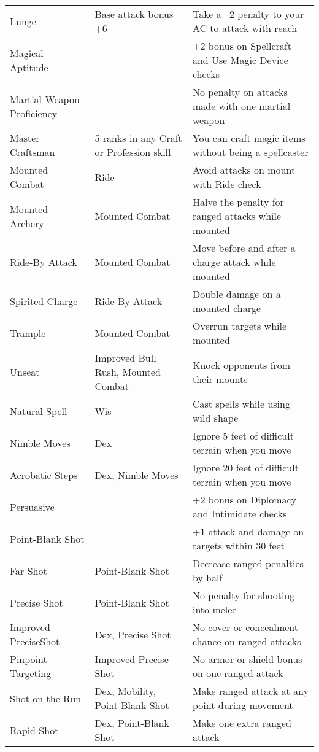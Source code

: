 \begin{table*}[]
\begin{tabularx}{\linewidth}{lXl}
Lunge & Base attack bonus +6 & Take a –2 penalty to your AC to attack with reach\\
Magical Aptitude & --- & +2 bonus on Spellcraft and Use Magic Device checks\\
Martial Weapon Proficiency & --- & No penalty on attacks made with one martial weapon\\
Master Craftsman & 5 ranks in any Craft or Profession skill & You can craft magic items without being a spellcaster\\
Mounted Combat & Ride & Avoid attacks on mount with Ride check\\
\quad Mounted Archery & Mounted Combat & Halve the penalty for ranged attacks while mounted\\
\quad Ride-By Attack & Mounted Combat & Move before and after a charge attack while mounted\\
\quad \quad Spirited Charge & Ride-By Attack & Double damage on a mounted charge\\
\quad Trample & Mounted Combat & Overrun targets while mounted\\
\quad Unseat & Improved Bull Rush, Mounted Combat & Knock opponents from their mounts\\
Natural Spell & Wis & Cast spells while using wild shape\\
Nimble Moves & Dex & Ignore 5 feet of difficult terrain when you move\\
\quad Acrobatic Steps & Dex, Nimble Moves & Ignore 20 feet of difficult terrain when you move\\
Persuasive & --- &  +2 bonus on Diplomacy and Intimidate checks\\
Point-Blank Shot & --- & +1 attack and damage on targets within 30 feet\\
\quad Far Shot & Point-Blank Shot & Decrease ranged penalties by half\\
\quad Precise Shot & Point-Blank Shot & No penalty for shooting into melee\\
\quad \quad Improved PreciseShot & Dex, Precise Shot & No cover or concealment chance on ranged attacks\\
\quad  Pinpoint Targeting & Improved Precise Shot & No armor or shield bonus on one ranged attack\\
\quad Shot on the Run & Dex, Mobility, Point-Blank Shot & Make ranged attack at any point during movement\\
\quad Rapid Shot & Dex, Point-Blank Shot & Make one extra ranged attack\\

\end{tabularx}
\end{table*}
